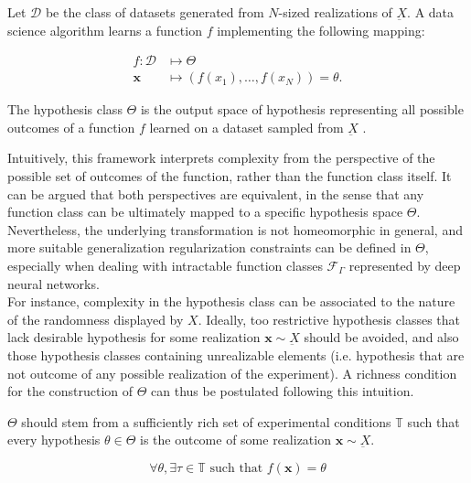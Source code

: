\begin{definition}
    Let $\mathcal{D}$ be the class of datasets generated from $N$-sized realizations of $\underbar{X}$. 
    A data science algorithm learns a function $f$ implementing the following mapping:

    $$
    \begin{aligned}
        f: \mathcal{D} & \longmapsto \Theta \\
        \bm{x}  & \longmapsto (f(x_1), \dots, f(x_N)) = \theta.
    \end{aligned}
    $$

    The hypothesis class $\Theta$ is the output space of hypothesis representing all 
    possible outcomes of a function $f$ learned on a dataset sampled from $\underbar{X}$
    \cite{buhmannDataScienceAlgorithms2022}.

\end{definition}

Intuitively, this framework interprets complexity from the perspective of the possible
set of outcomes of the function, rather than the function class itself. It can be argued
that both perspectives are equivalent, in the sense that any function class can be 
ultimately mapped to a specific hypothesis space $\Theta$. Nevertheless, the underlying transformation is not
homeomorphic in general, and more suitable generalization regularization
constraints can be defined in $\Theta$, especially when dealing with intractable
function classes $\mathcal{F}_{\Gamma}$ represented by deep neural networks. \\

For instance, complexity in the hypothesis class can be associated to the nature of the
randomness displayed by $X$. Ideally, too restrictive hypothesis classes that lack desirable
hypothesis for some realization $\bm{x} \sim \underbar{X}$ should be avoided, and also those hypothesis
classes containing unrealizable elements (i.e. hypothesis that are not outcome of
any possible realization of the experiment). A richness condition for the construction of $\Theta$ 
can thus be postulated following this intuition. \\

\begin{definition}
    $\Theta$ should stem from a
    sufficiently rich set of experimental conditions $\mathbb{T}$ such that every hypothesis $\theta \in \Theta$
    is the outcome of some realization $\bm{x} \sim \underbar{X}$.

    $$
    \forall \theta, \exists \tau \in \mathbb{T} \text{ such that } f(\bm{x}) = \theta
    $$
\end{definition}



